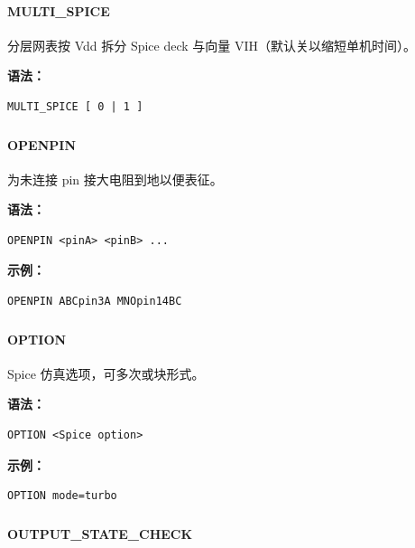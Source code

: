 \paragraph*{MULTI_SPICE}

分层网表按 Vdd 拆分 Spice deck 与向量 VIH（默认关以缩短单机时间）。

\textbf{语法：}
\begin{lstlisting}
MULTI_SPICE [ 0 | 1 ]
\end{lstlisting}

\subsubsection{}
\paragraph*{OPENPIN}

为未连接 pin 接大电阻到地以便表征。

\textbf{语法：}
\begin{lstlisting}
OPENPIN <pinA> <pinB> ...
\end{lstlisting}

\textbf{示例：}
\begin{lstlisting}
OPENPIN ABCpin3A MNOpin14BC
\end{lstlisting}

\subsubsection{}
\paragraph*{OPTION}

Spice 仿真选项，可多次或块形式。

\textbf{语法：}
\begin{lstlisting}
OPTION <Spice option>
\end{lstlisting}

\textbf{示例：}
\begin{lstlisting}
OPTION mode=turbo
\end{lstlisting}

\subsubsection{}
\paragraph*{OUTPUT_STATE_CHECK}

